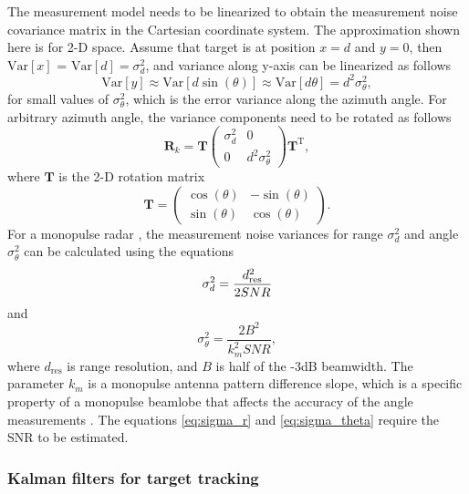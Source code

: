 \documentclass[english, 12pt, a4paper, elec, utf8, a-1b, online]{aaltothesis}
\numberwithin{equation}{section}
\renewcommand{\vec}[1]{\mathbf{#1}}
\newcommand{\ocov}{\vec{R}_k}
\newcommand{\transpose}[1]{#1^\text{T}}
\newcommand{\rotmat}{\mathbf{T}}
\newcommand{\Var}[1]{\text{Var}\left[ #1 \right]}
\begin{document}
The measurement model needs to be linearized to obtain the measurement noise covariance matrix in the Cartesian coordinate system.
The approximation shown here is for 2-D space.
Assume that target is at position $x=d$ and $y=0$, then $\Var{x}$ = $\Var{d} = \sigma_d^2$, and variance along y-axis can be linearized as follows
\begin{equation*}
    \Var{y} \approx \Var{d \sin\left(\theta\right)} \approx \Var{d \theta} = d^2\sigma_\theta^2,
\end{equation*} 
for small values of $\sigma_\theta^2$, which is the error variance along the azimuth angle.
For arbitrary azimuth angle, the variance components need to be rotated as follows
\begin{equation} \label{eq:cartesian_measurement_covariance}
    \ocov = \rotmat 
    \begin{pmatrix}
            \sigma_d^2 & 0 \\
            0 & d^2 \sigma_\theta^2
    \end{pmatrix}
    \transpose{\rotmat},
\end{equation}
where $\rotmat$ is the 2-D rotation matrix
\begin{equation}
    \rotmat = 
    \begin{pmatrix}
            \cos(\theta) & -\sin(\theta) \\
            \sin(\theta) & \cos(\theta)
    \end{pmatrix}.
\end{equation}
For a monopulse radar \cite{Sherman2011}, the measurement noise variances for range $\sigma_d^2$ and angle $\sigma_\theta^2$ can be calculated using the equations \cite{Curry2011}
\begin{equation}
    \sigma_d^2 =  \frac{d_\text{res}^2}{2 SNR}  \label{eq:sigma_r}\\
\end{equation}
and
\begin{equation}
    \sigma_\theta^2 =  \frac{2 B^2}{k_m^2 SNR} \label{eq:sigma_theta},
\end{equation}
where $d_\text{res}$ is range resolution, and $B$ is half of the -3dB beamwidth. 
The parameter $k_m$ is a monopulse antenna pattern difference slope, which is a specific property of a monopulse beamlobe that affects the accuracy of the angle measurements \cite{Sherman2011}.
The equations \eqref{eq:sigma_r} and \eqref{eq:sigma_theta} require the SNR to be estimated.

\subsubsection{Kalman filters for target tracking} \label{sec:kalman_filter}
\end{document}
